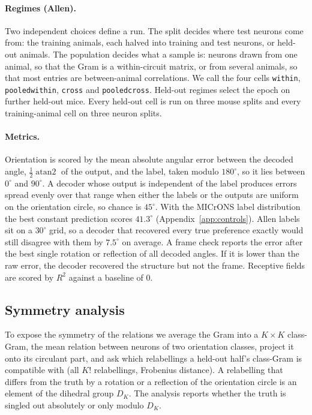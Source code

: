 \documentclass[11pt]{article}
\newcommand{\code}[1]{\texttt{#1}}
\newcommand{\Rsq}{R^{2}}
\begin{document}
\paragraph{Regimes (Allen).} Two independent choices define a run. The split decides where test neurons come from: the training animals, each halved into training and test neurons, or held-out animals. The population decides what a sample is: neurons drawn from one animal, so that the Gram is a within-circuit matrix, or from several animals, so that most entries are between-animal correlations. We call the four cells \code{within}, \code{pooledwithin}, \code{cross} and \code{pooledcross}. Held-out regimes select the epoch on further held-out mice. Every held-out cell is run on three mouse splits and every training-animal cell on three neuron splits.

\paragraph{Metrics.} Orientation is scored by the mean absolute angular error between the decoded angle, $\tfrac12\operatorname{atan2}$ of the output, and the label, taken modulo $180^\circ$, so it lies between $0^\circ$ and $90^\circ$. A decoder whose output is independent of the label produces errors spread evenly over that range when either the labels or the outputs are uniform on the orientation circle, so chance is $45^\circ$. With the MICrONS label distribution the best constant prediction scores $41.3^\circ$ (Appendix~\ref{app:controls}). Allen labels sit on a $30^\circ$ grid, so a decoder that recovered every true preference exactly would still disagree with them by $7.5^\circ$ on average. A frame check reports the error after the best single rotation or reflection of all decoded angles. If it is lower than the raw error, the decoder recovered the structure but not the frame. Receptive fields are scored by $\Rsq$ against a baseline of 0.

\subsection{Symmetry analysis}

To expose the symmetry of the relations we average the Gram into a $K\times K$ class-Gram, the mean relation between neurons of two orientation classes, project it onto its circulant part, and ask which relabellings a held-out half's class-Gram is compatible with (all $K!$ relabellings, Frobenius distance). A relabelling that differs from the truth by a rotation or a reflection of the orientation circle is an element of the dihedral group $D_K$. The analysis reports whether the truth is singled out absolutely or only modulo $D_K$.
\end{document}
